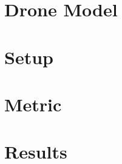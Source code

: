 \section{Drone Model}

\newpage

\section{Setup}

\newpage

\section{Metric}

\newpage

\section{Results}